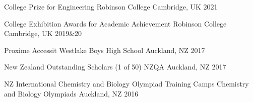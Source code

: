 



\begin{cvhonors}

  \cvhonor
    {College Prize for Engineering} %
    {Robinson College} %
    {Cambridge, UK} %
    {2021} %

  \cvhonor
    {College Exhibition Awards for Academic Achievement} %
    {Robinson College} %
    {Cambridge, UK} %
    {2019\&20} %

  \cvhonor
    {Proxime Accessit} %
    {Westlake Boys High School } %
    {Auckland, NZ} %
    {2017} %

  \cvhonor
    {New Zealand Outstanding Scholars (1 of 50)} %
    {NZQA} %
    {Auckland, NZ} %
    {2017} %

  \cvhonor
    {NZ International Chemistry and Biology Olympiad Training Camps} %
    {Chemistry and Biology Olympiads}
    {Auckland, NZ} %
    {2016} %

\end{cvhonors}